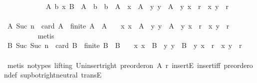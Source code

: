 \begin{isabellebody}
\ \ \ \ \ \ \ \ \ \ {\isasymlongrightarrow}\ {\isacharparenleft}{\isasymexists}\ A{\isacharprime}\ b\ x{\isachardot}\ B\ {\isacharequal}\ A{\isacharprime}\ {\isasymunion}\ {\isacharbraceleft}b{\isacharbraceright}\ {\isasymand}\ b\ {\isasymnotin}\ A{\isacharprime}\ {\isasymand}\ x\ {\isasymin}\ A{\isacharprime}\ {\isasymand}\ {\isacharparenleft}{\isasymforall}y{\isachardot}\ y\ {\isasymin}\ A{\isacharprime}\ {\isasymlongrightarrow}\ {\isacharparenleft}y{\isacharcomma}\ x{\isacharparenright}\ {\isasymin}\ r\ {\isasymor}\ {\isacharparenleft}x{\isacharcomma}\ y{\isacharparenright}\ {\isasymnotin}\ r{\isacharparenright}{\isacharparenright}{\isachardoublequoteclose}\isanewline
\ \ \ \ \ \ \ \ \isamarkupfalse%
\ {\isacartoucheopen}{\isasymforall}A{\isachardot}\ Suc\ n\ {\isacharequal}\ card\ A\ {\isasymlongrightarrow}\ finite\ A\ {\isasymlongrightarrow}\ A\ {\isasymnoteq}\ {\isasymemptyset}\ {\isasymlongrightarrow}\ {\isacharparenleft}{\isasymexists}x{\isachardot}\ x\ {\isasymin}\ A\ {\isasymand}\ {\isacharparenleft}{\isasymforall}y{\isachardot}\ y\ {\isasymin}\ A\ {\isasymlongrightarrow}\ {\isacharparenleft}y{\isacharcomma}\ x{\isacharparenright}\ {\isasymin}\ r\ {\isasymor}\ {\isacharparenleft}x{\isacharcomma}\ y{\isacharparenright}\ {\isasymnotin}\ r{\isacharparenright}{\isacharparenright}{\isacartoucheclose}\ \isanewline
\ \ \ \ \ \ \ \ \isamarkupfalse%
\ metis\isanewline
\ \ \ \ \ \ \isamarkupfalse%
\ \isamarkupfalse%
\ {\isachardoublequoteopen}{\isasymforall}B{\isachardot}\ Suc\ {\isacharparenleft}Suc\ n{\isacharparenright}\ {\isacharequal}\ card\ B\ {\isasymlongrightarrow}\ finite\ B\ {\isasymlongrightarrow}\ B\ {\isasymnoteq}\ {\isasymemptyset}\ {\isasymlongrightarrow}\ {\isacharparenleft}{\isasymexists}x{\isachardot}\ x\ {\isasymin}\ B\ {\isasymand}\ {\isacharparenleft}{\isasymforall}y{\isachardot}\ y\ {\isasymin}\ B\ {\isasymlongrightarrow}\ {\isacharparenleft}y{\isacharcomma}\ x{\isacharparenright}\ {\isasymin}\ r\ {\isasymor}\ {\isacharparenleft}x{\isacharcomma}\ y{\isacharparenright}\ {\isasymnotin}\ r{\isacharparenright}{\isacharparenright}{\isachardoublequoteclose}\isanewline
\ \ \ \ \ \ \ \ \isamarkupfalse%
\ {\isacharparenleft}metis\ {\isacharparenleft}no{\isacharunderscore}types{\isacharcomma}\ lifting{\isacharparenright}\ Un{\isacharunderscore}insert{\isacharunderscore}right\ {\isacartoucheopen}preorder{\isacharunderscore}on\ A\ r{\isacartoucheclose}\ insertE\ insert{\isacharunderscore}iff\ preorder{\isacharunderscore}on{\isacharunderscore}def\ sup{\isacharunderscore}bot{\isachardot}right{\isacharunderscore}neutral\ transE{\isacharparenright}\isanewline

\end{isabellebody}
